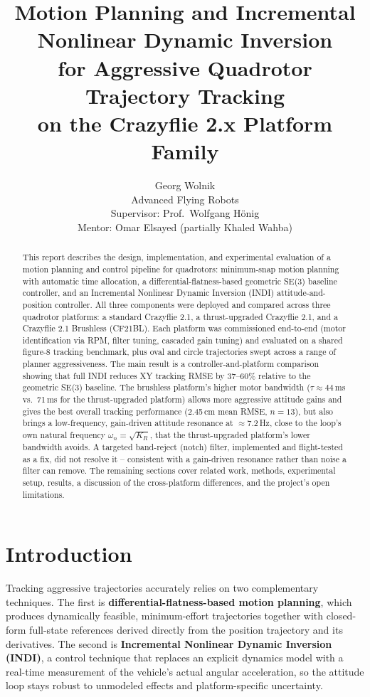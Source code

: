 \documentclass[11pt,a4paper]{article}
\title{\color{frcblue}Motion Planning and Incremental Nonlinear Dynamic Inversion\\
for Aggressive Quadrotor Trajectory Tracking\\
on the Crazyflie 2.x Platform Family}
\author{Georg Wolnik \\ \small Advanced Flying Robots \\
\small Supervisor: Prof.\ Wolfgang H\"onig \\ \small Mentor: Omar Elsayed (partially Khaled Wahba)}
\date{}
\begin{document}
\maketitle

\begin{abstract}
This report describes the design, implementation, and experimental evaluation of a motion
planning and control pipeline for quadrotors: minimum-snap motion planning with automatic time
allocation, a differential-flatness-based geometric SE(3) baseline controller, and an Incremental
Nonlinear Dynamic Inversion (INDI) attitude-and-position controller. All three components were
deployed and compared across three quadrotor platforms: a standard Crazyflie 2.1, a
thrust-upgraded Crazyflie 2.1, and a Crazyflie 2.1 Brushless (CF21BL). Each platform was
commissioned end-to-end (motor identification via RPM, filter tuning, cascaded gain tuning) and
evaluated on a shared figure-8 tracking benchmark, plus oval and circle trajectories swept across
a range of planner aggressiveness. The main result is a controller-and-platform comparison
showing that full INDI reduces XY tracking RMSE by 37--60\% relative to the geometric SE(3)
baseline. The brushless platform's higher motor bandwidth ($\tau\approx44$\,ms vs.\ 71\,ms for the
thrust-upgraded platform) allows more aggressive attitude gains and gives the best overall
tracking performance (2.45\,cm mean RMSE, $n=13$), but also brings a low-frequency, gain-driven
attitude resonance at $\approx7.2$\,Hz, close to the loop's own natural frequency
$\omega_n=\sqrt{K_R}$, that the thrust-upgraded platform's lower bandwidth avoids. A targeted
band-reject (notch) filter, implemented and flight-tested as a fix, did not resolve it --
consistent with a gain-driven resonance rather than noise a filter can remove. The remaining
sections cover related work, methods, experimental setup, results, a discussion of the
cross-platform differences, and the project's open limitations.
\end{abstract}

\section{Introduction}

Tracking aggressive trajectories accurately relies on two complementary techniques. The first is
\textbf{differential-flatness-based motion planning}, which produces dynamically feasible,
minimum-effort trajectories together with closed-form full-state references derived directly from
the position trajectory and its derivatives. The second is \textbf{Incremental Nonlinear Dynamic
Inversion (INDI)}, a control technique that replaces an explicit dynamics model with a real-time
measurement of the vehicle's actual angular acceleration, so the attitude loop stays robust to
unmodeled effects and platform-specific uncertainty.
\end{document}
